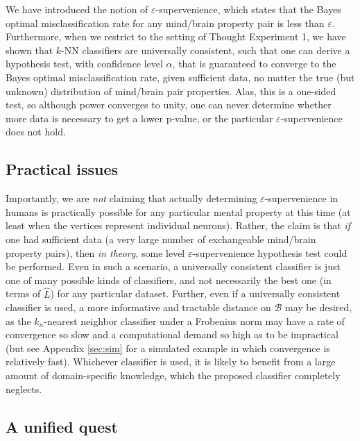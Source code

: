 \documentclass{article}
\newcommand{\mB}{\mathcal{B}}
\newcommand{\eps}{\varepsilon}
\providecommand{\mh}[1]{\widehat{#1}}
\begin{document}
We have introduced the notion of $\eps$-supervenience, which states that the Bayes optimal misclassification rate for any mind/brain property pair is less than $\eps$.  Furthermore, when we restrict to the setting of Thought Experiment 1, we have shown that $k$-NN classifiers are universally consistent, such that one can derive a hypothesis test, with confidence level $\alpha$, that is guaranteed to converge to the Bayes optimal misclassification rate, given sufficient data, no matter the true (but unknown) distribution of mind/brain pair properties.  Alas, this is a one-sided test, so although power converges to unity, one can never determine whether more data is necessary to get a lower p-value, or the particular $\eps$-supervenience does not hold.  

\subsection{Practical issues} %
\label{par:practical_issues}

Importantly, we are \emph{not} claiming that actually determining $\eps$-supervenience in humans is practically possible for any particular mental property at this time (at least when the vertices represent individual neurons).  Rather, the claim is that \emph{if} one had sufficient data (a very large number of exchangeable mind/brain property pairs), then \emph{in theory}, some level $\eps$-supervenience hypothesis test could be performed.  Even in such a scenario, a universally consistent classifier is just one of many possible kinds of classifiers, and not necessarily the best one (in terms of $\mh{L}$) for any particular dataset.  Further, even if a universally consistent classifier is used, a more informative and tractable distance on $\mB$ may be desired, as the $k_n$-nearest neighbor classifier under a Frobenius norm may have a rate of convergence so slow and a computational demand so high as to be impractical (but see Appendix \ref{sec:sim} for a simulated example in which convergence is relatively fast).  Whichever classifier is used, it is likely to benefit from a large amount of domain-specific knowledge, which the proposed classifier completely neglects. 




\subsection{A unified quest} %
\label{sub:practical_applications}
\end{document}
